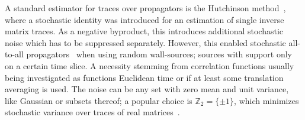 
A standard estimator for traces over propagators is the Hutchinson method~\cite{Hutchinson01011990}, where a stochastic identity was introduced for an estimation of single inverse matrix traces.
As a negative byproduct, this introduces additional stochastic noise which has to be suppressed separately.
However, this enabled stochastic all-to-all propagators~\cite{Foley:2005ac} when using random wall-sources; sources with support only on a certain time slice.
A necessity stemming from correlation functions usually being investigated as functions Euclidean time or if at least some translation averaging is used.
The noise can be any set with zero mean and unit variance, like Gaussian or subsets thereof; a popular choice is $\mathbb{Z}_2 = \{\pm 1\}$, which minimizes stochastic variance over traces of real matrices~\cite{Bernardson:1993he}.

